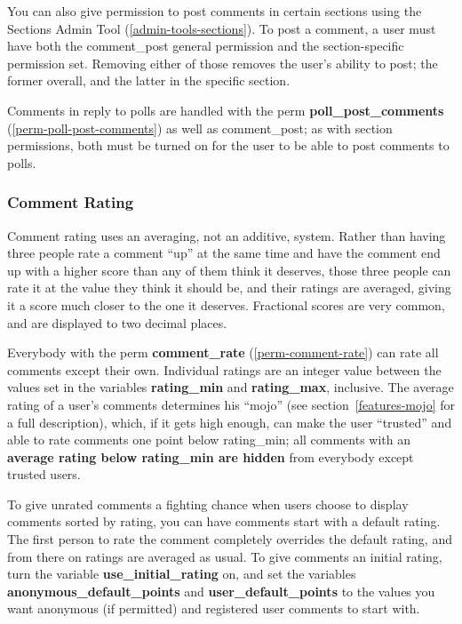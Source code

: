 You can also give permission to post comments in certain sections using the Sections Admin Tool (\ref{admin-tools-sections}).  To post a comment, a user must have both the comment\_post general permission and the section-specific permission set.  Removing either of those removes the user's ability to post; the former overall, and the latter in the specific section.  

Comments in reply to polls are handled with the perm {\bf poll\_post\_comments} (\ref{perm-poll-post-comments}) as well as comment\_post; as with section permissions, both must be turned on for the user to be able to post comments to polls.

\subsubsection{Comment Rating}
\label{comments-rate}

Comment rating uses an averaging, not an additive, system.  Rather than having three people rate a comment ``up'' at the same time and have the comment end up with a higher score than any of them think it deserves, those three people can rate it at the value they think it should be, and their ratings are averaged, giving it a score much closer to the one it deserves.  Fractional scores are very common, and are displayed to two decimal places.

Everybody with the perm {\bf comment\_rate} (\ref{perm-comment-rate}) can rate all comments except their own.  Individual ratings are an integer value between the values set in the variables {\bf rating\_min} and {\bf rating\_max}, inclusive.  The average rating of a user's comments determines his ``mojo'' (see section~\ref{features-mojo} for a full description), which, if it gets high enough, can make the user ``trusted'' and able to rate comments one point below rating\_min; all comments with an {\bf average rating below rating\_min are hidden} from everybody except trusted users.

To give unrated comments a fighting chance when users choose to display comments sorted by rating, you can have comments start with a default rating.  The first person to rate the comment completely overrides the default rating, and from there on ratings are averaged as usual.  To give comments an initial rating, turn the variable {\bf use\_initial\_rating} on, and set the variables {\bf anonymous\_default\_points} and {\bf user\_default\_points} to the values you want anonymous (if permitted) and registered user comments to start with.

